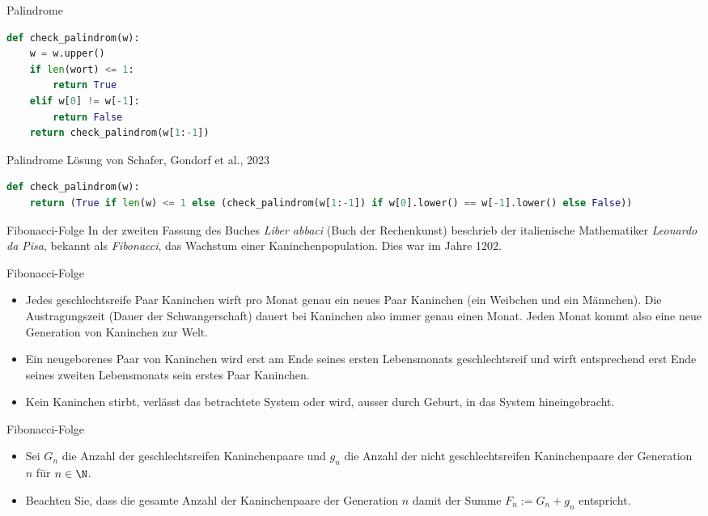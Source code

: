 \begin{frame}[fragile]{Palindrome}
\begin{lstlisting}[language=Python]
def check_palindrom(w):
    w = w.upper()
    if len(wort) <= 1:
        return True
    elif w[0] != w[-1]:
        return False
    return check_palindrom(w[1:-1])
\end{lstlisting}
\end{frame}

\begin{frame}[fragile]{Palindrome}
Lösung von Schafer, Gondorf et al., 2023
\lstset{basicstyle=\ttfamily\scriptsize}
\begin{lstlisting}[language=Python]
def check_palindrom(w):
    return (True if len(w) <= 1 else (check_palindrom(w[1:-1]) if w[0].lower() == w[-1].lower() else False))
\end{lstlisting}
\lstset{basicstyle=\ttfamily\normalsize}
\end{frame}

\begin{frame}[fragile]{Fibonacci-Folge}
In der zweiten Fassung des Buches \textit{Liber abbaci} (Buch der Rechenkunst) beschrieb der italienische Mathematiker \textit{Leonardo da Pisa}, bekannt als \textit{Fibonacci}, das Wachstum einer Kaninchenpopulation. Dies war im Jahre 1202.
\end{frame}


\begin{frame}[fragile]{Fibonacci-Folge}
\begin{itemize}[<+->]
    \item Jedes geschlechtsreife Paar Kaninchen wirft pro Monat genau ein neues Paar Kaninchen (ein Weibchen und ein Männchen). Die Austragungszeit (Dauer der Schwangerschaft) dauert bei Kaninchen also immer genau einen Monat. Jeden Monat kommt also eine neue Generation von Kaninchen zur Welt.
    \item Ein neugeborenes Paar von Kaninchen wird erst am Ende seines ersten Lebensmonats geschlechtsreif und wirft entsprechend erst Ende seines zweiten Lebensmonats sein erstes Paar Kaninchen.
    \item Kein Kaninchen stirbt, verlässt das betrachtete System oder wird, ausser durch Geburt, in das System hineingebracht.
\end{itemize}
\end{frame}


\begin{frame}[fragile]{Fibonacci-Folge}
\begin{itemize}[<+->]
    \item Sei $G_n$ die Anzahl der geschlechtsreifen Kaninchenpaare und $g_n$ die Anzahl der nicht geschlechtsreifen Kaninchenpaare der Generation $n$ für $n\in\N$.
    \item Beachten Sie, dass die gesamte Anzahl der Kaninchenpaare der Generation $n$ damit der Summe $F_n := G_n+g_n$ entspricht.
\end{itemize}
\end{frame}


